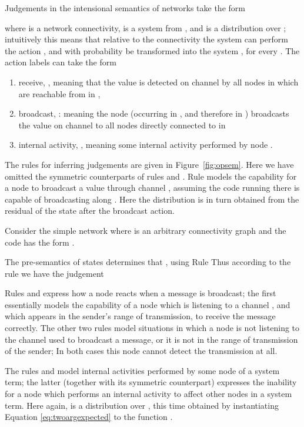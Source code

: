 \documentclass{LMCS}
\begin{document}
Judgements in the intensional semantics of networks take the form

where   is a network connectivity,  is a system from , 
and  is a distribution over ; 
intuitively this means that relative to the  connectivity  the 
system  can perform 
the action , and with probability  be transformed into 
the system , for every  . 
 The action labels can take the form
\begin{enumerate}[label=(\roman*)]
\item receive, , meaning that the value  is detected on 
channel  by all nodes in  which are reachable from  in ,

\item broadcast, : meaning the node  (occurring in
  , and therefore in ) broadcasts the value  on
  channel  to all nodes directly connected to  in 

\item internal activity, , meaning some internal activity performed 
by node .
\end{enumerate}

\noindent The rules for inferring judgements are given in
Figure~\ref{fig:opsem}. Here we have omitted the 
symmetric counterparts of rules  and 
.
Rule  models the capability for a node to broadcast a value  through 
channel , assuming the code running there
is capable of broadcasting along . 
Here the distribution  is in turn obtained from the residual of the state  after the broadcast action. 
\begin{exa}
  Consider the simple network  where  is 
  an arbitrary connectivity graph and the code  has the form 
. 

The pre-semantics of states determines that , 
using Rule 
Thus according to the rule  
 we have the judgement

\end{exa}\vspace{6 pt}

\noindent Rules  and  express how a node reacts 
when a message is broadcast; the first essentially models the capability of a node which is 
listening to a channel , and which appears in the sender's range of transmission, 
to receive the message correctly. The other two rules model situations in which a node is 
not listening to the channel used to broadcast a message, or it is not in the range of transmission of the sender;
 In both cases this node cannot detect the transmission at all.

The rules  and  model internal activities performed 
by some node of a system term; the latter (together with its symmetric 
counterpart) expresses the inability for a node which 
performs an internal activity to affect other nodes in a system term. Here again,  
is a distribution over , this time obtained by instantiating Equation \eqref{eq:twoargexpected} to 
the function .
\end{document}
